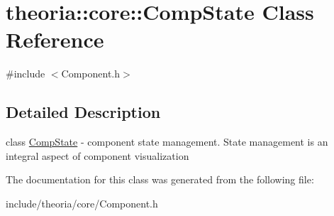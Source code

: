 \hypertarget{classtheoria_1_1core_1_1CompState}{}\section{theoria\+:\+:core\+:\+:Comp\+State Class Reference}
\label{classtheoria_1_1core_1_1CompState}


{\ttfamily \#include $<$Component.\+h$>$}



\subsection{Detailed Description}
class \hyperlink{classtheoria_1_1core_1_1CompState}{Comp\+State} -\/ component state management. State management is an integral aspect of component visualization 

The documentation for this class was generated from the following file\+:\begin{DoxyCompactItemize}
\item 
include/theoria/core/Component.\+h\end{DoxyCompactItemize}
